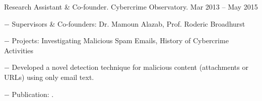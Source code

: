 \documentclass[10pt]{article}
\newcommand{\halfblankline}{\quad\vspace{-0.5\baselineskip}\pagebreak[3]}
\begin{document}
\begin{innerlist}
	\item Research Assistant \& Co-founder. Cybercrime Observatory. \hfill {Mar 2013 -- May 2015}
	\begin{innerlist}
		\item[$-$] Supervisors \& Co-founders: Dr. Mamoun Alazab, Prof. Roderic Broadhurst
		\item[$-$] Projects: Investigating Malicious Spam Emails, History of Cybercrime Activities
		\item[$-$] Developed a novel detection technique for malicious content (attachments or URLs) using only email text.
		\item[$-$] Publication: \cite{Tran2013c}.
	\end{innerlist}
	
	\halfblankline
	

\end{innerlist}
\end{document}
